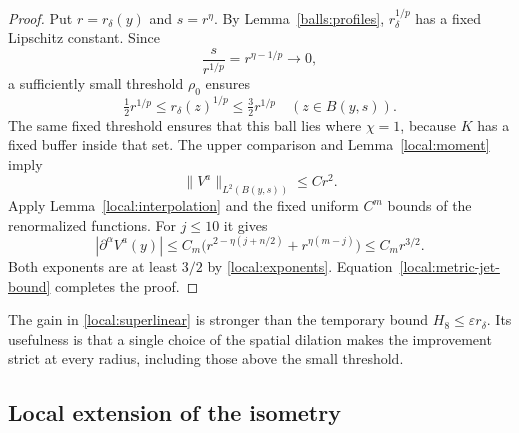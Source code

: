 \documentclass[11pt]{article}
\theoremstyle{definition}
\theoremstyle{remark}
\numberwithin{equation}{section}
\begin{document}
\begin{proof}
Put $r=r_\delta(y)$ and $s=r^\eta$.  By
Lemma~\ref{balls:profiles}, $r_\delta^{1/p}$ has a fixed Lipschitz
constant.  Since
\[
 \frac{s}{r^{1/p}}=r^{\eta-1/p}\longrightarrow0,
\]
a sufficiently small threshold $\rho_0$ ensures
\[
 \tfrac12 r^{1/p}\leq r_\delta(z)^{1/p}
                         \leq\tfrac32 r^{1/p}
             \quad(z\in B(y,s)).
\]
The same fixed threshold ensures that this ball lies where $\chi=1$,
because $K$ has a fixed buffer inside that set.  The upper comparison
and Lemma~\ref{local:moment} imply
\[
 \|V^a\|_{L^2(B(y,s))}\leq C r^2.
\]
Apply Lemma~\ref{local:interpolation} and the fixed uniform $C^m$
bounds of the renormalized functions.  For $j\leq10$ it gives
\[
 |\partial^\alpha V^a(y)|
   \leq C_m\bigl(r^{2-\eta(j+n/2)}+r^{\eta(m-j)}\bigr)
   \leq C_m r^{3/2}.
\]
Both exponents are at least $3/2$ by \eqref{local:exponents}.
Equation~\eqref{local:metric-jet-bound} completes the proof.
\end{proof}

The gain in \eqref{local:superlinear} is stronger than the temporary
bound $H_8\leq\varepsilon r_\delta$.  Its usefulness is that a single
choice of the spatial dilation makes the improvement strict at every
radius, including those above the small threshold.

\subsection{Local extension of the isometry}
\end{document}
